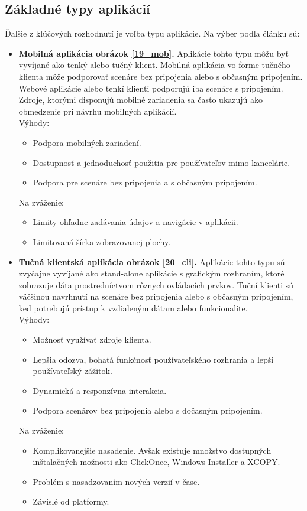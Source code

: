 \subsection{Základné typy aplikácií}
Ďalšie z kľúčových rozhodnutí je voľba typu aplikácie. Na výber podľa  článku \cite{IOT03} sú:
\begin{itemize}
\item
 \textbf{Mobilná aplikácia obrázok \ref{19_mob}.} Aplikácie tohto typu môžu byť vyvíjané ako tenký alebo tučný klient. Mobilná aplikácia vo forme tučného klienta môže podporovať scenáre bez pripojenia alebo s občasným pripojením. Webové aplikácie alebo tenkí klienti podporujú iba scenáre s pripojením. Zdroje, ktorými disponujú mobilné zariadenia sa často ukazujú ako obmedzenie pri návrhu mobilných aplikácií. \\
Výhody: 
 \begin{itemize}
   \item  Podpora mobilných zariadení.
   \item  Dostupnosť a jednoduchosť použitia pre používateľov mimo kancelárie.
   \item  Podpora pre scenáre bez pripojenia a s občasným pripojením.   
 \end{itemize}
Na zváženie: 
 \begin{itemize}
   \item Limity ohľadne zadávania údajov a navigácie v aplikácii.
   \item Limitovaná šírka zobrazovanej plochy.   
 \end{itemize}
 
\item
 \textbf{Tučná klientská aplikácia obrázok \ref{20_cli}.} Aplikácie tohto typu sú zvyčajne vyvíjané ako stand-alone aplikácie s grafickým rozhraním, ktoré zobrazuje dáta prostredníctvom rôznych ovládacích prvkov. Tuční klienti sú väčšinou navrhnutí na scenáre bez pripojenia alebo s občasným pripojením, keď potrebujú prístup k vzdialeným dátam alebo funkcionalite. \\
Výhody: 
 \begin{itemize}
   \item  Možnosť využívať zdroje klienta.
   \item  Lepšia odozva, bohatá funkčnosť používateľského rozhrania a lepší používateľský zážitok.
   \item  Dynamická a responzívna interakcia.
   \item Podpora scenárov bez pripojenia alebo s dočasným pripojením.   
 \end{itemize}
Na zváženie: 
 \begin{itemize}
   \item Komplikovanejšie nasadenie. Avšak existuje množstvo dostupných inštalačných možnosti ako ClickOnce, Windows Installer a XCOPY.
   \item Problém s nasadzovaním nových verzií v čase.   
   \item Závislé od platformy.
 \end{itemize}



\end{itemize}
